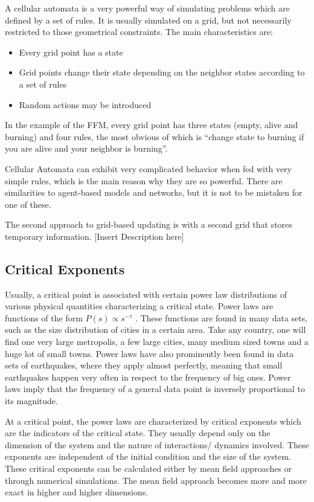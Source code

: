 \documentclass[11pt]{article}
\begin{document}
A cellular automata is a very powerful way of simulating problems which are defined by a set of rules. It is usually simulated on a grid, but not necessarily restricted to those geometrical constraints. The main characteristics are:
\begin{itemize}
\item Every grid point has a state

\item Grid points change their state depending on the neighbor states according to a set of rules

\item Random actions may be introduced
\end{itemize}

In the example of the FFM, every grid point has three states (empty, alive and burning) and four rules, the most obvious of which is “change state to burning if you are alive and your neighbor is burning”. 

Cellular Automata can exhibit very complicated behavior when fed with very simple rules, which is the main reason why they are so powerful. There are similarities to agent-based models and networks, but it is not to be mistaken for one of these.


The second approach to grid-based updating is with a second grid that stores temporary information. [Insert Description here]

\subsection{Critical Exponents}
Usually, a critical point is associated with certain power law distributions of various physical quantities characterizing a critical state. Power laws are functions of the form $ P(s) \varpropto s^{-\tau}$ . These functions are found in many data sets, such as the size distribution of cities in a certain area. Take any country, one will find one very large metropolis, a few large cities, many medium sized towns and a huge lot of small towns. Power laws have also prominently been found in data sets of earthquakes, where they apply almost perfectly, meaning that small earthquakes happen very often in respect to the frequency of big ones. Power laws imply that the frequency of a general data point is inversely proportional to its magnitude. 

At a critical point, the power laws are characterized by critical exponents which are the indicators of the critical state. They usually depend only on the dimension of the system and the nature of interactions/ dynamics involved. These exponents are independent of the initial condition and the size of the system. These critical exponents can be calculated either by mean field approaches or through numerical simulations. The mean field approach becomes more and more exact in higher and higher dimensions.
\end{document}
